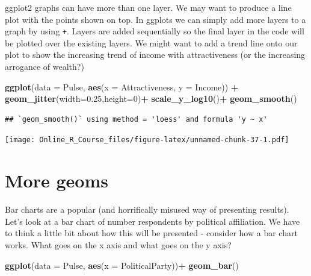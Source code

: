 \documentclass[]{book}
\newenvironment{Shaded}{\begin{snugshade}}{\end{snugshade}}
\newcommand{\DataTypeTok}[1]{\textcolor[rgb]{0.13,0.29,0.53}{#1}}
\newcommand{\DecValTok}[1]{\textcolor[rgb]{0.00,0.00,0.81}{#1}}
\newcommand{\FloatTok}[1]{\textcolor[rgb]{0.00,0.00,0.81}{#1}}
\newcommand{\KeywordTok}[1]{\textcolor[rgb]{0.13,0.29,0.53}{\textbf{#1}}}
\newcommand{\NormalTok}[1]{#1}
\newcommand{\OperatorTok}[1]{\textcolor[rgb]{0.81,0.36,0.00}{\textbf{#1}}}
\newcommand{\StringTok}[1]{\textcolor[rgb]{0.31,0.60,0.02}{#1}}
\begin{document}
ggplot2 graphs can have more than one layer. We may want to produce a line plot with the points shown on top. In ggplots we can simply add more layers to a graph by using \texttt{+}. Layers are added sequentially so the final layer in the code will be plotted over the existing layers. We might want to add a trend line onto our plot to show the increasing trend of income with attractiveness (or the increasing arrogance of wealth?)

\begin{Shaded}
\begin{Highlighting}[]
\KeywordTok{ggplot}\NormalTok{(}\DataTypeTok{data =}\NormalTok{ Pulse,  }\KeywordTok{aes}\NormalTok{(}\DataTypeTok{x =}\NormalTok{ Attractiveness, }\DataTypeTok{y =}\NormalTok{ Income)) }\OperatorTok{+}\StringTok{ }
\StringTok{  }\KeywordTok{geom_jitter}\NormalTok{(}\DataTypeTok{width=}\FloatTok{0.25}\NormalTok{,}\DataTypeTok{height=}\DecValTok{0}\NormalTok{)}\OperatorTok{+}
\StringTok{    }\KeywordTok{scale_y_log10}\NormalTok{()}\OperatorTok{+}
\StringTok{      }\KeywordTok{geom_smooth}\NormalTok{()}
\end{Highlighting}
\end{Shaded}

\begin{verbatim}
## `geom_smooth()` using method = 'loess' and formula 'y ~ x'
\end{verbatim}

\texttt{[image: Online\_R\_Course\_files/figure-latex/unnamed-chunk-37-1.pdf]}

\hypertarget{more-geoms-1}{%
\section{More geoms}\label{more-geoms-1}}

Bar charts are a popular (and horrifically misused way of presenting results). Let's look at a bar chart of number respondents by political affiliation. We have to think a little bit about how this will be presented - consider how a bar chart works. What goes on the x axis and what goes on the y axis?

\begin{Shaded}
\begin{Highlighting}[]
\KeywordTok{ggplot}\NormalTok{(}\DataTypeTok{data =}\NormalTok{ Pulse,  }\KeywordTok{aes}\NormalTok{(}\DataTypeTok{x =}\NormalTok{ PoliticalParty))}\OperatorTok{+}
\StringTok{  }\KeywordTok{geom_bar}\NormalTok{()}
\end{Highlighting}
\end{Shaded}
\end{document}
